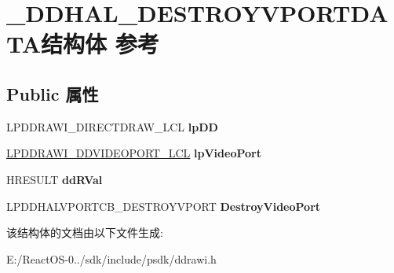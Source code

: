 \hypertarget{struct___d_d_h_a_l___d_e_s_t_r_o_y_v_p_o_r_t_d_a_t_a}{}\section{\+\_\+\+D\+D\+H\+A\+L\+\_\+\+D\+E\+S\+T\+R\+O\+Y\+V\+P\+O\+R\+T\+D\+A\+T\+A结构体 参考}
\label{struct___d_d_h_a_l___d_e_s_t_r_o_y_v_p_o_r_t_d_a_t_a}
\subsection*{Public 属性}
\begin{DoxyCompactItemize}
\item 
\mbox{\label{struct___d_d_h_a_l___d_e_s_t_r_o_y_v_p_o_r_t_d_a_t_a_ad3779751a8ecd4bbdb375fc361b0d61f}} 
L\+P\+D\+D\+R\+A\+W\+I\+\_\+\+D\+I\+R\+E\+C\+T\+D\+R\+A\+W\+\_\+\+L\+CL {\bfseries lp\+DD}
\item 
\mbox{\label{struct___d_d_h_a_l___d_e_s_t_r_o_y_v_p_o_r_t_d_a_t_a_a4eb8d4ecea6e65e5c506f93e5e549f8c}} 
\hyperlink{struct___d_d_r_a_w_i___d_d_v_i_d_e_o_p_o_r_t___l_c_l}{L\+P\+D\+D\+R\+A\+W\+I\+\_\+\+D\+D\+V\+I\+D\+E\+O\+P\+O\+R\+T\+\_\+\+L\+CL} {\bfseries lp\+Video\+Port}
\item 
\mbox{\label{struct___d_d_h_a_l___d_e_s_t_r_o_y_v_p_o_r_t_d_a_t_a_a74bf22afec7e3783c73e5a790e2e4837}} 
H\+R\+E\+S\+U\+LT {\bfseries dd\+R\+Val}
\item 
\mbox{\label{struct___d_d_h_a_l___d_e_s_t_r_o_y_v_p_o_r_t_d_a_t_a_ab6f39123b909f23117b0526751ebb264}} 
L\+P\+D\+D\+H\+A\+L\+V\+P\+O\+R\+T\+C\+B\+\_\+\+D\+E\+S\+T\+R\+O\+Y\+V\+P\+O\+RT {\bfseries Destroy\+Video\+Port}
\end{DoxyCompactItemize}


该结构体的文档由以下文件生成\+:\begin{DoxyCompactItemize}
\item 
E\+:/\+React\+O\+S-\/0../sdk/include/psdk/ddrawi.\+h\end{DoxyCompactItemize}

